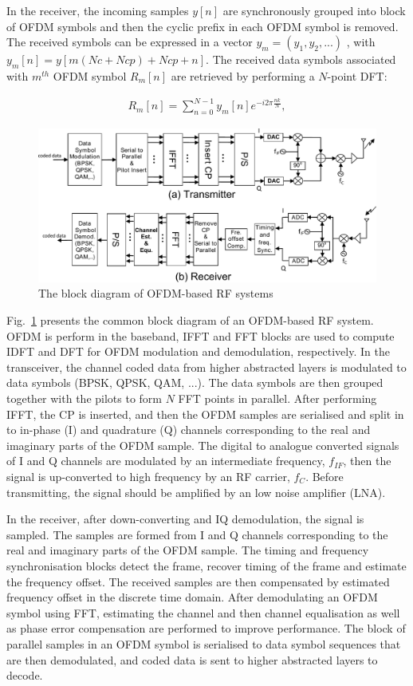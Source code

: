 In the receiver, the incoming samples $y[n]$ are synchronously  grouped into block of OFDM symbols and then the cyclic prefix in each OFDM symbol is removed. 
The received symbols can be expressed in a vector $y_{m} = (y_{1}, y_{2}, . . . )$ , with $y_{m}[n]=y[m(Nc+Ncp)+Ncp +n]$.
The received data symbols associated with $m^{th}$ OFDM symbol $R_{m}[n]$ are retrieved by performing a $N$-point DFT:

\begin{eqnarray}
\label{equ:receiveOFDMsymbol}
R_{m}[n] =  \sum_{n=0}^{N-1} y_{m}[n]e^{-i2\pi \frac{nk}{N}},
\end{eqnarray} 

\begin{figure}
	\centerline{\includegraphics [width=0.8\columnwidth] {Figures/OFDM-block.pdf} }
	\caption{The block diagram of OFDM-based RF systems}
	\label{fig:OFDM-block}
\end{figure}

Fig.~\ref{fig:OFDM-block} presents the common block diagram of an OFDM-based RF system.
OFDM is perform in the baseband, IFFT and FFT blocks are used to compute IDFT and DFT for OFDM modulation and demodulation, respectively.
In the transceiver, the channel coded data from higher abstracted layers is modulated to data symbols (BPSK, QPSK, QAM, ...). The data symbols are then grouped together with the pilots to form $N$ FFT points in parallel.
After performing IFFT, the CP is inserted, and then the OFDM samples are serialised and split in to in-phase (I) and quadrature (Q) channels corresponding to the real and imaginary parts of  the OFDM sample. 
The digital to analogue converted signals of I and Q channels are modulated by an intermediate frequency, $f_{IF}$, then the signal is up-converted to high frequency by an RF carrier, $f_{C}$. 
Before transmitting, the signal should be amplified by an low noise amplifier (LNA).

In the receiver, after down-converting and IQ demodulation, the signal is sampled. The samples are formed from I and Q channels corresponding to the real and imaginary parts of the OFDM sample.
The timing and frequency synchronisation blocks detect the frame, recover timing of the frame and estimate the frequency offset. 
The received samples are then compensated by estimated frequency offset in the discrete time domain. 
After demodulating an OFDM symbol using FFT, estimating the channel and then channel equalisation as well as phase error compensation are performed to improve performance.
The block of parallel samples in an OFDM symbol is serialised to data symbol sequences that are then demodulated, and coded data is sent to higher abstracted layers to decode.


